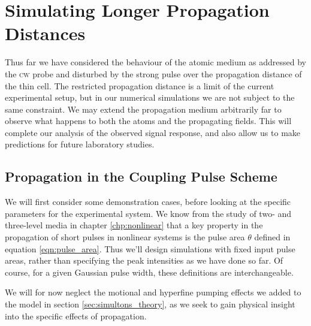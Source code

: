 \section{Simulating Longer Propagation Distances}
  \label{sec:simultons_long}

    Thus far we have considered the behaviour of the atomic medium as addressed
    by the \textsc{cw} probe and disturbed by the strong pulse over the
    propagation distance of the thin cell. The restricted propagation distance
    is a limit of the current experimental setup, but in our numerical
    simulations we are not subject to the same constraint. We may extend the
    propagation medium arbitrarily far to observe what happens to both the atoms
    and the propagating fields. This will complete our analysis of the observed
    signal response, and also allow us to make predictions for future laboratory
    studies.

  \subsection{Propagation in the Coupling Pulse Scheme}

    We will first consider some demonstration cases, before looking at the
    specific parameters for the experimental system. We know from the study of
    two- and three-level media in chapter \ref{chp:nonlinear} that a key
    property in the propagation of short pulses in nonlinear systems is the
    pulse area $\theta$ defined in equation \ref{eqn:pulse_area}. Thus we'll
    design simulations with fixed input pulse areas, rather than specifying the
    peak intensities as we have done so far. Of course, for a given Gaussian
    pulse width, these definitions are interchangeable.

    We will for now neglect the motional and hyperfine pumping effects we added
    to the model in section \ref{sec:simultons_theory}, as we seek to gain
    physical insight into the specific effects of propagation.

